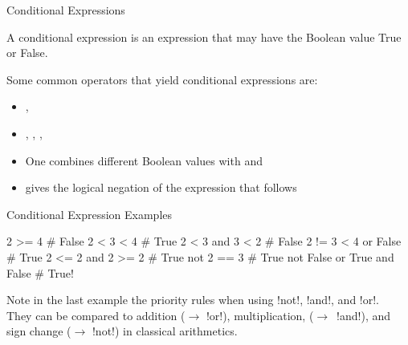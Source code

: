 \documentclass[hyperref={pdfpagelabels=false},table, handout]{beamer}
\begin{document}
\begin{frame}[fragile]{Conditional Expressions}
\begin{defblock}A \alert{conditional expression} is an expression that may have the \alert{Boolean} value \alert{True} or \alert{False}.
\end{defblock}
\pause
Some common operators that yield conditional expressions are:
\begin{itemize}
\item \pyth{==}, \pyth{!=}
\item \pyth{<}, \pyth{>}, \pyth{<=}, \pyth{>=}
\item One combines different Boolean values with  and 
\item {} gives the \alert{logical negation} of the expression that follows
\end{itemize}
\end{frame}

\begin{frame}[fragile]{Conditional Expression Examples}
\begin{example}
\begin{python}
2 >= 4  # False
2 < 3 < 4 # True
2 < 3 and 3 < 2 # False
2 != 3 < 4 or False # True
2 <= 2 and 2 >= 2 # True
not 2 == 3 # True
not False or True and False # True!
\end{python}
\end{example}
Note in the last example the priority rules when using  \pyth!not!, \pyth!and!, and \pyth!or!.\\
They can be compared to addition ($\rightarrow$ \pyth!or!), multiplication, ($\rightarrow$~\pyth!and!),
and sign change ($\rightarrow$ \pyth!not!) in classical arithmetics.


\end{frame}
\end{document}
